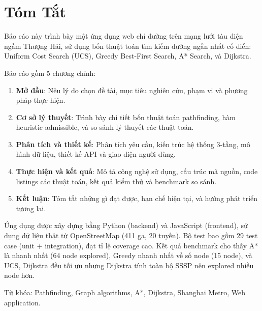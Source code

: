 \cleardoublepage

\chapter*{Tóm Tắt}

Báo cáo này trình bày một ứng dụng web chỉ đường trên mạng lưới tàu điện ngầm Thượng Hải, sử dụng bốn thuật toán tìm kiếm đường ngắn nhất cổ điển: Uniform Cost Search (UCS), Greedy Best-First Search, A* Search, và Dijkstra.

Báo cáo gồm 5 chương chính:

\begin{enumerate}
  \item \textbf{Mở đầu}: Nêu lý do chọn đề tài, mục tiêu nghiên cứu, phạm vi và phương pháp thực hiện.
  \item \textbf{Cơ sở lý thuyết}: Trình bày chi tiết bốn thuật toán pathfinding, hàm heuristic admissible, và so sánh lý thuyết các thuật toán.
  \item \textbf{Phân tích và thiết kế}: Phân tích yêu cầu, kiến trúc hệ thống 3-tầng, mô hình dữ liệu, thiết kế API và giao diện người dùng.
  \item \textbf{Thực hiện và kết quả}: Mô tả công nghệ sử dụng, cấu trúc mã nguồn, code listings các thuật toán, kết quả kiểm thử và benchmark so sánh.
  \item \textbf{Kết luận}: Tóm tắt những gì đạt được, hạn chế hiện tại, và hướng phát triển tương lai.
\end{enumerate}

Ứng dụng được xây dựng bằng Python (backend) và JavaScript (frontend), sử dụng dữ liệu thật từ OpenStreetMap (411 ga, 20 tuyến). Bộ test bao gồm 29 test case (unit + integration), đạt tỉ lệ coverage cao. Kết quả benchmark cho thấy A* là nhanh nhất (64 node explored), Greedy nhanh nhất về số node (15 node), và UCS, Dijkstra đều tối ưu nhưng Dijkstra tính toàn bộ SSSP nên explored nhiều node hơn.

Từ khóa: Pathfinding, Graph algorithms, A*, Dijkstra, Shanghai Metro, Web application.

\cleardoublepage

\mainmatter







\cleardoublepage
\printbibliography[title=Tài liệu tham khảo]

